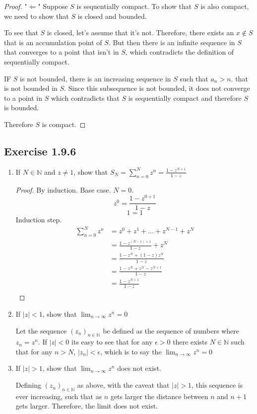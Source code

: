 \documentclass{tufte-book}
\theoremstyle{mytheoremstyle}
\theoremstyle{mylemstyle}
\theoremstyle{mydefstyle}
\begin{document}
\begin{proof}"$\Leftarrow$"
Suppose $S$ is sequentially compact. To show that $S$ is also compact, we need to show that $S$ is closed and bounded.

To see that $S$ is closed, let's assume that it's not.  Therefore, there exists an $x \notin S$ that is an accumulation point of $S$.  But then there is an infinite sequence in $S$ that converges to a point that isn't in $S$, which contradicts the definition of sequentially compact.

IF $S$ is not bounded, there is an increasing sequence in $S$ such that $a_n > n$.  that is not bounded in $S$.  Since this subsequence is not bounded, it does not converge to a point in $S$ which contradicts that $S$ is sequentially compact and therefore $S$ is bounded.

Therefore $S$ is compact.
\end{proof}

\subsection{Exercise 1.9.6}
\begin{enumerate}

\item If $N \in \mathbb{N}$ and $z \neq 1$, show that $S_N = \sum_{n=0}^{N}z^n = \frac{1-z^{N+1}}{1-z}$

\begin{proof}By induction.
Base case. $N=0$.
\[z^0 = \frac{1-z^{0+1}}{1-z}\]
\[1 = 1\]
Induction step.  
\begin{align*}
\sum_{n=0}^{N}z^n &= z^0+z^1+...+z^{N-1} + z^{N}\\
 &= \frac{1-z^{(N-1)+1}}{1-z} + z^{N}\\
 &= \frac{1-z^{N} + (1-z)z^{N}}{1-z}\\
 &= \frac{1-z^{N} + z^{N} - z^{N+1}}{1-z}\\
 &= \frac{1-z^{N+1}}{1-z}\\
\end{align*}
\end{proof}

\item If $|z| < 1$, show that $\lim_{n \rightarrow \infty}z^n =0$

Let the sequence $(z_n)_{n \in \mathbb{N}}$ be defined as the sequence of numbers where $z_n = z^n$.  If $|z| < 0$ its easy to see that for any $\epsilon > 0$ there exists $N \in \mathbb{N}$ such that for any $n > N$, $|z_n| < \epsilon$, which is to say the $\lim_{n \rightarrow \infty}z^n =0$

\item If $|z| > 1$, show that $\lim_{n \rightarrow \infty}z^n$ does not exist.

Defining $(z_n)_{n \in \mathbb{N}}$ as above, with the caveat that $|z| > 1$, this sequence is ever increasing, such that as $n$ gets larger the distance between $n$ and $n+1$ gets larger.  Therefore, the limit does not exist.

\end{enumerate}
\end{document}
